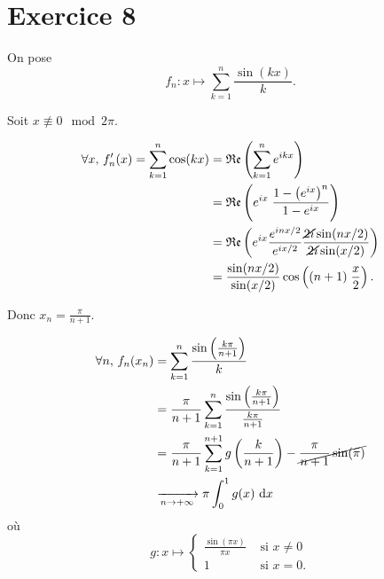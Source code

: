 \part{Exercice 8}

On pose \[
	f_n : x \mapsto  \sum_{k=1}^n \frac{\sin(kx)}{k}
.\]

Soit $x \not\equiv 0 \mod {2\pi}$.

\begin{align*}
	\forall x,\, f'_n(x) = \sum_{k=1}^n \cos(kx) &= \Re\left( \sum_{k=1}^n e^{ikx} \right) \\
	&= \Re\left( e^{ix}\; \frac{1 - \left( e^{ix} \right)^n}{1-e^{ix}} \right) \\
	&= \Re\left( e^{ix} \frac{e^{inx/2}}{e^{ix/2}} \frac{\cancel{2i}\sin(nx / 2)}{\cancel{2i}\sin(x/2)} \right) \\
	&= \frac{\sin(nx/2)}{\sin(x/2)} \cos\left( (n+1)\;\frac{x}{2} \right). \\
\end{align*}



Donc $x_n = \frac{\pi}{n+1}$.

\begin{align*}
	\forall n,\,f_n(x_n) &= \sum_{k=1}^n \frac{\sin\left( \frac{k\pi}{n+1} \right)}{k}\\
	&= \frac{\pi}{n+1} \sum_{k=1}^n \frac{\sin\left( \frac{k\pi}{n+1} \right)}{\frac{k\pi}{n+1}} \\
	&= \frac{\pi}{n+1} \sum_{k=1}^{n+1} g\left( \frac{k}{n+1} \right) - \cancel{\frac{\pi}{n+1} \sin(\pi)} \\
	&\xrightarrow[n\to +\infty]{} \pi \int_{0}^{1} g(x)~\mathrm{d}x
\end{align*}
où \[
	g: x \mapsto \begin{cases}
		\frac{\sin(\pi x)}{\pi x} &\text{ si } x \neq 0\\
		1 &\text{ si } x = 0.
	\end{cases}
\]
